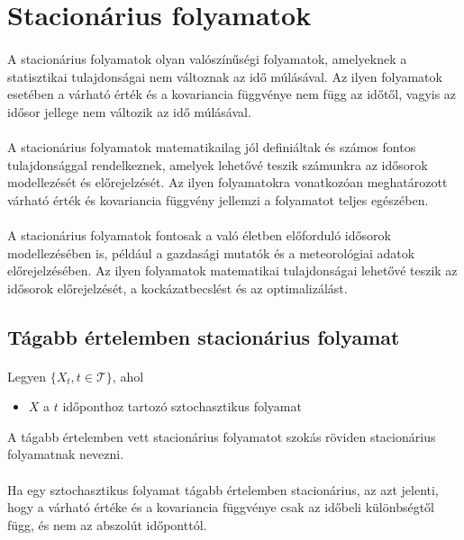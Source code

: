 \documentclass[11pt,a4pape,draftr]{article}
\begin{document}
		\section{Stacionárius folyamatok}
			\paragraph{}
				A stacionárius folyamatok olyan valószínűségi folyamatok, amelyeknek a statisztikai tulajdonságai nem változnak az idő múlásával. Az ilyen folyamatok esetében a várható érték és a kovariancia függvénye nem függ az időtől, vagyis az idősor jellege nem változik az idő múlásával.
			\paragraph{}
				A stacionárius folyamatok matematikailag jól definiáltak és számos fontos tulajdonsággal rendelkeznek, amelyek lehetővé teszik számunkra az idősorok modellezését és előrejelzését. Az ilyen folyamatokra vonatkozóan meghatározott várható érték és kovariancia függvény jellemzi a folyamatot teljes egészében. 
			\paragraph{}
				A stacionárius folyamatok fontosak a való életben előforduló idősorok modellezésében is, például a gazdasági mutatók és a meteorológiai adatok előrejelzésében. Az ilyen folyamatok matematikai tulajdonságai lehetővé teszik az idősorok előrejelzését, a kockázatbecslést és az optimalizálást. 
			\subsection{Tágabb értelemben stacionárius folyamat}
				\paragraph{}
					Legyen $\{X_t, t \in \mathcal{T}\}$, ahol
					\begin{itemize}
						\item $X$ a $t$ időponthoz tartozó sztochasztikus folyamat
					\end{itemize}
					A tágabb értelemben vett stacionárius folyamatot szokás röviden stacionárius folyamatnak nevezni.
				\paragraph{}
					Ha egy sztochasztikus folyamat tágabb értelemben stacionárius, az azt jelenti, hogy a várható értéke és a kovariancia függvénye csak az időbeli különbségtől függ, és nem az abszolút időponttól.
\end{document}
